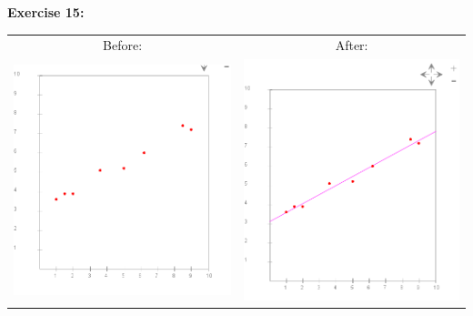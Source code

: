 \documentclass[10pt]{article}
\begin{document}
	\textbf{\large Exercise 15:}\\
	\begin{tabular}{cc}
		Before: & After:\\ 
		\includegraphics[scale=.3]{module7_exercise15_a} & \includegraphics[scale=.3]{module7_exercise15_b}
	\end{tabular}
	
\end{document}
